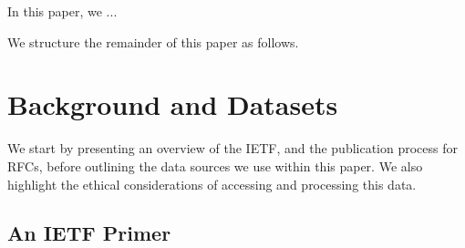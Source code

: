 \documentclass[twocolumn,10pt]{article}
\begin{document}




In this paper, we ...





We structure the remainder of this paper as follows.

\section{Background and Datasets}


We start by presenting an overview of the IETF, and the publication process
for RFCs, before outlining the data sources we use within this paper. We
also highlight the ethical considerations of accessing and processing this
data.


\subsection{An IETF Primer}
\end{document}
